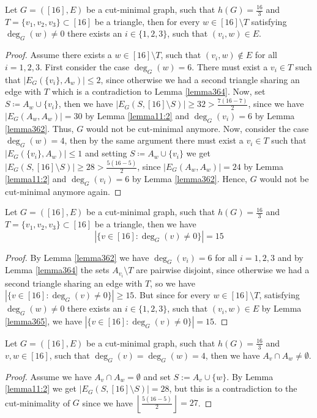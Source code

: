 \begin{lem}\label{lemma365}
Let \(G=([16],E)\) be a cut-minimal graph, such that \(h(G)=\frac{16}{3}\) and \(T=\{v_1,v_2,v_3\}\subset [16]\) be a triangle, then for every \(w\in [16]\setminus T\) satisfying \(\deg_G(w)\neq 0\) there exists an \(i\in\{1,2,3\}\), such that \((v_i,w)\in E\).
\begin{proof}
Assume there exists a \(w\in [16]\setminus T\), such that \((v_i,w)\notin E\) for all \(i=1,2,3\). First consider the case \(\deg_G(w)=6\). There must exist a \(v_i\in T\) such that \(|E_G(\{v_i\},A_w)|\leq 2\), since otherwise we had a second triangle sharing an edge with \(T\) which is a contradiction to Lemma \ref{lemma364}. Now, set \(S\coloneqq A_w\cup\{v_i\}\), then we have \(|E_G(S,[16]\setminus S)|\geq 32>\frac{7(16-7)}{2}\), since we have \(|E_G(A_w,A_w)|=30\) by Lemma \ref{lemma11:2} and \(\deg_G(v_i)=6\) by Lemma \ref{lemma362}. Thus, \(G\) would not be cut-minimal anymore. Now, consider the case \(\deg_G(w)=4\), then by the same argument there must exist a \(v_i\in T\) such that \(|E_G(\{v_i\},A_w)|\leq 1\) and setting \(S\coloneqq A_w\cup\{v_i\}\) we get \(|E_G(S,[16]\setminus S)|\geq 28>\frac{5(16-5)}{2}\), since \(|E_G(A_w,A_w)|=24\) by Lemma \ref{lemma11:2} and \(\deg_G(v_i)=6\) by Lemma \ref{lemma362}. Hence, \(G\) would not be cut-minimal anymore again.
\end{proof}
\end{lem}

\begin{lem}\label{lemma366}
Let \(G=([16],E)\) be a cut-minimal graph, such that \(h(G)=\frac{16}{3}\) and \(T=\{v_1,v_2,v_3\}\subset [16]\) be a triangle, then we have
\[
|\{v\in [16]:\deg_G(v)\neq 0\}|=15
\]
\begin{proof}
By Lemma \ref{lemma362} we have \(\deg_G(v_i)=6\) for all \(i=1,2,3\) and by Lemma \ref{lemma364} the sets \(A_{v_i}\setminus T\) are pairwise disjoint, since otherwise we had a second triangle sharing an edge with \(T\), so we have \(|\{v\in [16]:\deg_G(v)\neq 0\}|\geq 15\). But since for every \(w\in [16]\setminus T\), satisfying \(\deg_G(w)\neq 0\) there exists an \(i\in\{1,2,3\}\), such that \((v_i,w)\in E\) by Lemma \ref{lemma365}, we have \(|\{v\in [16]:\deg_G(v)\neq 0\}|=15\).
\end{proof}
\end{lem}

\begin{lem}\label{lemma367}
Let \(G=([16],E)\) be a cut-minimal graph, such that \(h(G)=\frac{16}{3}\) and \(v,w\in [16]\), such that \(\deg_G(v)=\deg_G(w)=4\), then we have \(A_v\cap A_w\neq\emptyset\).
\begin{proof}
Assume we have \(A_v\cap A_w=\emptyset\) and set \(S:=A_v\cup\{w\}\). By Lemma \ref{lemma11:2} we get \(|E_G(S,[16]\setminus S)|=28\), but this is a contradiction to the cut-minimality of \(G\) since we have \(\left\lfloor\frac{5(16-5)}{2}\right\rfloor=27\).
\end{proof}
\end{lem}

